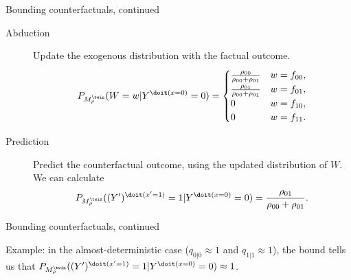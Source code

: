\begin{frame}{Bounding counterfactuals, continued}
  \begin{Eg}
    \begin{description}
      \item[Abduction] Update the exogenous distribution with the factual outcome.
        {\small
  $$P_{M_{\rho}^{\twin}}(W=w | Y^{\doit(x=0)}=0) = 
    \begin{cases}
      \frac{\rho_{00}}{\rho_{00} + \rho_{01}} & w = f_{00}, \\
      \frac{\rho_{01}}{\rho_{00} + \rho_{01}} & w = f_{01}, \\
      0 & w = f_{10}, \\
      0 & w = f_{11}.
    \end{cases}$$}
  \item[Prediction] Predict the counterfactual outcome, using the updated distribution of $W$.
    We can calculate
  $$P_{M_{\rho}^\twin}((Y')^{\doit(x'=1)} = 1 | Y^{\doit(x=0)}=0) = \frac{\rho_{01}}{\rho_{00} + \rho_{01}}.$$
    \end{description}
  \end{Eg}
\end{frame}
\begin{frame}{Bounding counterfactuals, continued}
Example: in the almost-deterministic case ($q_{0|0} \approx 1$ and $q_{1|1} \approx 1$),
the bound tells us that $P_{M_{\rho}^\twin}((Y')^{\doit(x'=1)} = 1 | Y^{\doit(x=0)}=0) \approx 1$.
\end{frame}


